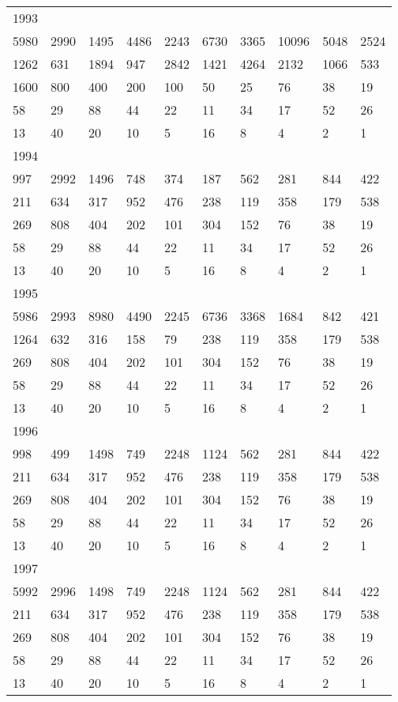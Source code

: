 \begin{longtable}{*{10}{l}}
1993&&&&&&&&&\\
5980& 2990& 1495& 4486& 2243& 6730& 3365& 10096& 5048& 2524\\
1262& 631& 1894& 947& 2842& 1421& 4264& 2132& 1066& 533\\
1600& 800& 400& 200& 100& 50& 25& 76& 38& 19\\
58& 29& 88& 44& 22& 11& 34& 17& 52& 26\\
13& 40& 20& 10& 5& 16& 8& 4& 2& 1\\

1994&&&&&&&&&\\
997& 2992& 1496& 748& 374& 187& 562& 281& 844& 422\\
211& 634& 317& 952& 476& 238& 119& 358& 179& 538\\
269& 808& 404& 202& 101& 304& 152& 76& 38& 19\\
58& 29& 88& 44& 22& 11& 34& 17& 52& 26\\
13& 40& 20& 10& 5& 16& 8& 4& 2& 1\\

1995&&&&&&&&&\\
5986& 2993& 8980& 4490& 2245& 6736& 3368& 1684& 842& 421\\
1264& 632& 316& 158& 79& 238& 119& 358& 179& 538\\
269& 808& 404& 202& 101& 304& 152& 76& 38& 19\\
58& 29& 88& 44& 22& 11& 34& 17& 52& 26\\
13& 40& 20& 10& 5& 16& 8& 4& 2& 1\\

1996&&&&&&&&&\\
998& 499& 1498& 749& 2248& 1124& 562& 281& 844& 422\\
211& 634& 317& 952& 476& 238& 119& 358& 179& 538\\
269& 808& 404& 202& 101& 304& 152& 76& 38& 19\\
58& 29& 88& 44& 22& 11& 34& 17& 52& 26\\
13& 40& 20& 10& 5& 16& 8& 4& 2& 1\\

1997&&&&&&&&&\\
5992& 2996& 1498& 749& 2248& 1124& 562& 281& 844& 422\\
211& 634& 317& 952& 476& 238& 119& 358& 179& 538\\
269& 808& 404& 202& 101& 304& 152& 76& 38& 19\\
58& 29& 88& 44& 22& 11& 34& 17& 52& 26\\
13& 40& 20& 10& 5& 16& 8& 4& 2& 1\\


\end{longtable}

